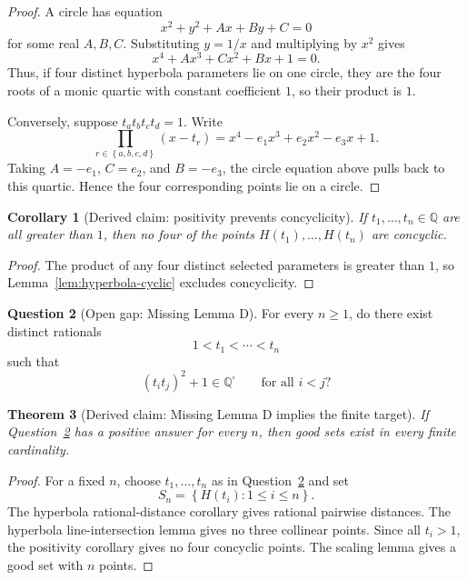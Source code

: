 \documentclass[11pt]{article}
\newtheorem{theorem}{Theorem}
\newtheorem{corollary}[theorem]{Corollary}
\theoremstyle{definition}
\newtheorem{question}[theorem]{Question}
\theoremstyle{remark}
\newcommand{\Q}{\mathbb{Q}}
\newcommand{\Qs}{\Q^{\square}}
\newcommand{\set}[1]{\left\{#1\right\}}
\begin{document}
\begin{proof}
A circle has equation
\[
x^2+y^2+Ax+By+C=0
\]
for some real \(A,B,C\).  Substituting \(y=1/x\) and multiplying by \(x^2\)
gives
\[
x^4+Ax^3+Cx^2+Bx+1=0.
\]
Thus, if four distinct hyperbola parameters lie on one circle, they are the
four roots of a monic quartic with constant coefficient \(1\), so their product
is \(1\).

Conversely, suppose \(t_a t_b t_c t_d=1\).  Write
\[
\prod_{r\in\set{a,b,c,d}}(x-t_r)=x^4-e_1x^3+e_2x^2-e_3x+1.
\]
Taking \(A=-e_1\), \(C=e_2\), and \(B=-e_3\), the circle equation above pulls
back to this quartic.  Hence the four corresponding points lie on a circle.
\end{proof}

\begin{corollary}[Derived claim: positivity prevents concyclicity]
If \(t_1,
\ldots,t_n\in\Q\) are all greater than \(1\), then no four of the points
\(H(t_1),\ldots,H(t_n)\) are concyclic.
\end{corollary}

\begin{proof}
The product of any four distinct selected parameters is greater than \(1\), so
Lemma~\ref{lem:hyperbola-cyclic} excludes concyclicity.
\end{proof}

\begin{question}[Open gap: Missing Lemma D]\label{q:missing-d}
For every \(n\ge 1\), do there exist distinct rationals
\[
1<t_1<\cdots<t_n
\]
such that
\[
{(t_i t_j)}^2+1\in\Qs
\qquad
\text{for all }i<j?
\]
\end{question}

\begin{theorem}[Derived claim: Missing Lemma D implies the finite target]
If Question~\ref{q:missing-d} has a positive answer for every \(n\), then good
sets exist in every finite cardinality.
\end{theorem}

\begin{proof}
For a fixed \(n\), choose \(t_1,
\ldots,t_n\) as in Question~\ref{q:missing-d} and set
\[
S_n=\set{H(t_i):1\le i\le n}.
\]
The hyperbola rational-distance corollary gives rational pairwise distances.
The hyperbola line-intersection lemma gives no three collinear points.  Since
all \(t_i>1\), the positivity corollary gives no four concyclic points.  The
scaling lemma gives a good set with \(n\) points.
\end{proof}
\end{document}
